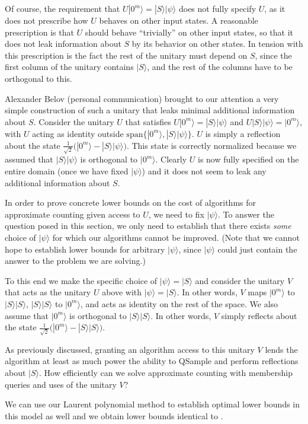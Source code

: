 \documentclass[10pt,a4paper]{article}
\newcommand{\<}{\langle}
\renewcommand{\>}{\rangle}
\begin{document}
Of course, the requirement that $U|0^m\> = |S\>|\psi\>$ does not fully specify $U$, as
it does not prescribe how $U$ behaves on other input states.
A reasonable prescription is that $U$ should behave ``trivially'' on other input states, so that it does not leak information about $S$ by its behavior on other states. 
In tension with this prescription is the fact the rest of the unitary must depend on $S$, since the first column of the unitary contains $|S\>$, and the rest of the columns have to be orthogonal to this.

Alexander Belov (personal communication) brought to our attention a 
very simple construction of such a unitary that leaks minimal additional information about $S$. 
Consider the unitary $U$ that satisfies $U|0^m\> = |S\>|\psi\>$ and $U|S\>|\psi\> = |0^m\>$, with $U$ acting as identity outside $\mathrm{span}\{|0^m\>,|S\>|\psi\>\}$. $U$ is simply a reflection about the state $\frac{1}{\sqrt{2}}\bigl(|0^m\>-|S\>|\psi\>\bigr)$. This state is correctly normalized because we assumed that $|S\>|\psi\>$ is orthogonal to $|0^m\>$. 
Clearly $U$ is now fully specified on the entire domain (once we have fixed $|\psi\>$) and it does not seem to leak any additional information about $S$.

In order to prove concrete lower bounds on the cost
of algorithms for approximate counting given access to $U$, we need to fix $|\psi\>$. 
To answer the question posed in this section, we only need to establish that there exists \emph{some} choice of $|\psi\>$ for which our algorithms cannot be improved. (Note that we cannot hope to establish lower bounds for arbitrary $|\psi\>$, since $|\psi\>$ could just contain the answer to the problem we are solving.)

To this end we make the specific choice of $|\psi\> = |S\>$ and consider the unitary $V$ that acts as the unitary $U$ above with $|\psi\> = |S\>$. 
In other words, $V$ maps $|0^m\>$ to $|S\>|S\>$, $|S\>|S\>$ to $|0^m\>$, and acts as identity on the rest of the space. 
We also assume that $|0^m\>$ is orthogonal to $|S\>|S\>$. 
In other words, $V$ simply reflects about the state $\frac{1}{\sqrt{2}}\bigl(|0^m\>-|S\>|S\>\bigr)$.

As previously discussed, granting an algorithm access to this unitary $V$ lends the algorithm at least as much power the ability to QSample and perform reflections about $|S\>$. How efficiently can we solve approximate counting with membership queries and uses of the unitary $V$? 

We can use our Laurent polynomial method to establish optimal lower bounds in this model as well and we obtain lower bounds identical to . 
\end{document}
